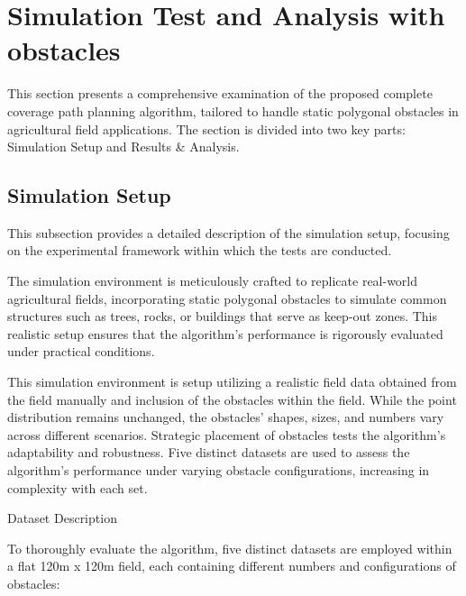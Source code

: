 
\chapter{Simulation Test and Analysis with obstacles} 


This section presents a comprehensive examination of the proposed complete coverage path planning algorithm, tailored to handle static polygonal obstacles in agricultural field applications. The section is divided into two key parts: Simulation Setup and Results \& Analysis.

\section{Simulation Setup}

This subsection provides a detailed description of the simulation setup, focusing on the experimental framework within which the tests are conducted.

\vspace{3mm}  


The simulation environment is meticulously crafted to replicate real-world agricultural fields, incorporating static polygonal obstacles to simulate common structures such as trees, rocks, or buildings that serve as keep-out zones. This realistic setup ensures that the algorithm's performance is rigorously evaluated under practical conditions.

\vspace{3mm}  

This simulation environment is setup utilizing a realistic field data obtained from the field manually and inclusion of the obstacles within the field. While the point distribution remains unchanged, the obstacles' shapes, sizes, and numbers vary across different scenarios. Strategic placement of obstacles tests the algorithm's adaptability and robustness. Five distinct datasets are used to assess the algorithm's performance under varying obstacle configurations, increasing in complexity with each set.



\vspace{3mm}  

Dataset Description

To thoroughly evaluate the algorithm, five distinct datasets are employed within a flat 120m x 120m field, each containing different numbers and configurations of obstacles:

